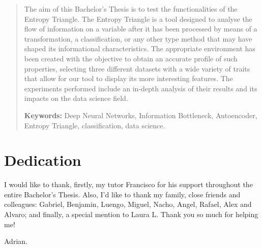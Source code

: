 \documentclass[12pt]{report}
\begin{document}
\newpage %
\thispagestyle{empty}
\mbox{}

\renewcommand\abstractname{\large\uppercase{Abstract}}
\begin{abstract}
\thispagestyle{plain}
\setcounter{page}{3}
	
The aim of this Bachelor's Thesis is to test the functionalities of the Entropy Triangle. The Entropy Triangle is a tool designed to analyse the flow of information on a variable after it has been processed by means of a transformation, a classification, or any other type method that may have shaped its informational characteristics. The appropriate environment has been created with the objective to obtain an accurate profile of such properties, selecting three different datasets with a wide variety of traits that allow for our tool to display its more interesting features. The experiments performed include an in-depth analysis of their results and its impacts on the data science field.
	
	\textbf{Keywords:} Deep Neural Networks, Information Bottleneck, Autoencoder, Entropy Triangle, classification, data science.
	
	\vfill
\end{abstract}

	\newpage %
	\thispagestyle{empty}
	\mbox{}

\chapter*{Dedication}

\begin{center}
	\vspace*{\fill}
	I would like to thank, firstly, my tutor Francisco for his support throughout the entire Bachelor's Thesis. Also, I'd like to thank my family, close friends and colleagues: Gabriel, Benjamin, Luengo, Miguel, Nacho, Angel, Rafael, Alex and Alvaro; and finally, a special mention to Laura L. Thank you so much for helping me!
	
	Adrian.
	\vspace*{\fill}
\end{center}
\clearpage



\setcounter{page}{5}
	
\end{document}
